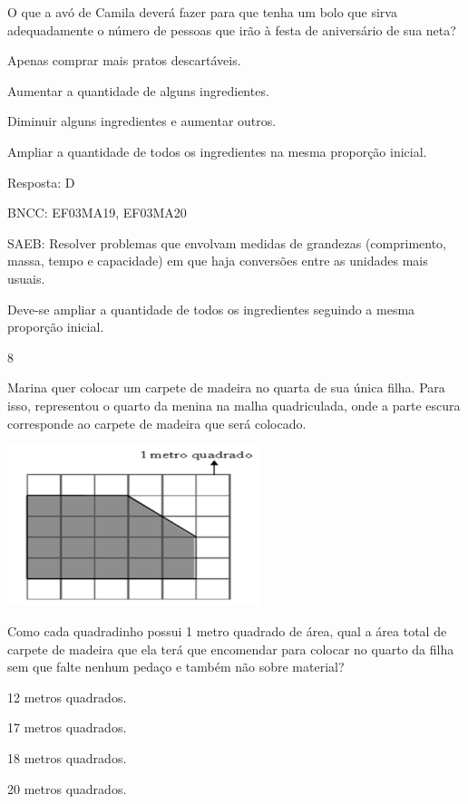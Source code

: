\begin{escolha}
{\begin{escolha}
{O que a avó de Camila deverá fazer para que tenha um bolo que sirva
adequadamente o número de pessoas que irão à festa de aniversário de sua neta?

\begin{escolha}
\item
  Apenas comprar mais pratos descartáveis.
\item
  Aumentar a quantidade de alguns ingredientes.
\item
  Diminuir alguns ingredientes e aumentar outros.
\item
  Ampliar a quantidade de todos os ingredientes na mesma proporção inicial.
\end{escolha}

Resposta: D

BNCC: EF03MA19, EF03MA20

SAEB: Resolver problemas que envolvam medidas de grandezas (comprimento, massa, tempo e capacidade) em que haja conversões entre as
unidades mais usuais.

Deve-se ampliar a quantidade de todos os ingredientes seguindo a mesma
proporção inicial.

\num{8}

Marina quer colocar um carpete de madeira no quarta de sua única filha.
Para isso, representou o quarto da menina na malha quadriculada, onde a parte escura corresponde ao carpete de madeira que será
colocado.


\includegraphics[width=2.90385in,height=1.84662in]{media/image123.png}

Como cada quadradinho possui 1 metro quadrado de área, qual a área total
de carpete de madeira que ela terá que encomendar para colocar no quarto
da filha sem que falte nenhum pedaço e também não sobre material?

\begin{escolha}
\item
  12 metros quadrados.
\item
  17 metros quadrados.
\item
  18 metros quadrados.
\item
  20 metros quadrados.
\end{escolha}

}
\end{escolha}}
\end{escolha}
